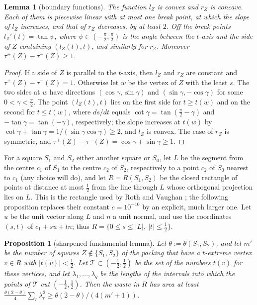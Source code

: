 \documentclass[11pt]{amsart}
\newtheorem{lemma}[theorem]{Lemma}
\newtheorem{proposition}[theorem]{Proposition}
\theoremstyle{definition}
\theoremstyle{remark}
\begin{document}
\begin{lemma}[boundary functions]\label{lem:bd}
The function $l_Z$ is convex and $r_Z$ is concave. Each of them is piecewise linear with at most one break point, at which
the slope of $l_Z$ increases, and that of $r_Z$ decreases, by at least $2$. Off the break points $l_Z'(t)=\tan\psi$, where
$\psi\in(-\frac\pi2,\frac\pi2)$ is the angle between the $t$-axis and the side of $Z$ containing $(l_Z(t),t)$, and similarly
for $r_Z$. Moreover $\tau^+(Z)-\tau^-(Z)\ge1$.
\end{lemma}

\begin{proof}
If a side of $Z$ is parallel to the $t$-axis, then $l_Z$ and $r_Z$ are constant and $\tau^+(Z)-\tau^-(Z)=1$. Otherwise let
$w$ be the vertex of $Z$ with the least $s$. The two sides at $w$ have directions $(\cos\gamma,\sin\gamma)$ and
$(\sin\gamma,-\cos\gamma)$ for some $0<\gamma<\frac\pi2$. The point $(l_Z(t),t)$ lies on the first side for $t\ge t(w)$ and on
the second for $t\le t(w)$, where $ds/dt$ equals $\cot\gamma=\tan(\frac\pi2-\gamma)$ and $-\tan\gamma=\tan(-\gamma)$,
respectively; the slope increases at $t(w)$ by $\cot\gamma+\tan\gamma=1/(\sin\gamma\cos\gamma)\ge2$, and $l_Z$ is
convex. The case of $r_Z$ is symmetric, and $\tau^+(Z)-\tau^-(Z)=\cos\gamma+\sin\gamma\ge1$.
\end{proof}

For a square $S_1$ and $S_2$ either another square or $S_0$, let
$L$ be the segment from the centre $c_1$ of $S_1$ to the centre $c_2$ of $S_2$, respectively to a point $c_2$ of $S_0$ nearest to
$c_1$ (any choice will do), and let $R=R(S_1,S_2)$ be the closed rectangle of points at distance at most $\frac12$ from the line through $L$ whose
orthogonal projection lies on $L$. This is the rectangle used by Roth and Vaughan \cite[\S3, p.~172]{RV}; the following
proposition replaces their constant $c=10^{-10}$ by an explicit, much larger one. Let $u$ be the unit vector along $L$
and $n$ a unit normal, and use the coordinates $(s,t)$ of $c_1+su+tn$; thus $R=\{0\le s\le|L|,\ |t|\le\frac12\}$.

\begin{proposition}[sharpened fundamental lemma]\label{prop:FL}
Let $\theta:=\theta(S_1,S_2)$, and let $m'$ be the number of squares $Z\notin\{S_1,S_2\}$ of the packing that have a
$t$-extreme vertex $v\in R$ with $|t(v)|<\frac12$. Let $\mathcal T\subset(-\frac12,\frac12)$ be the set of the numbers $t(v)$
for these vertices, and let $\lambda_1,\dots,\lambda_q$ be the lengths of the intervals into which the points of $\mathcal T$
cut $(-\frac12,\frac12)$. Then the waste in $R$ has area at least
$\frac{\theta(2-\theta)}4\sum_r\lambda_r^2\ge\theta(2-\theta)/(4(m'+1))$.
\end{proposition}
\end{document}
